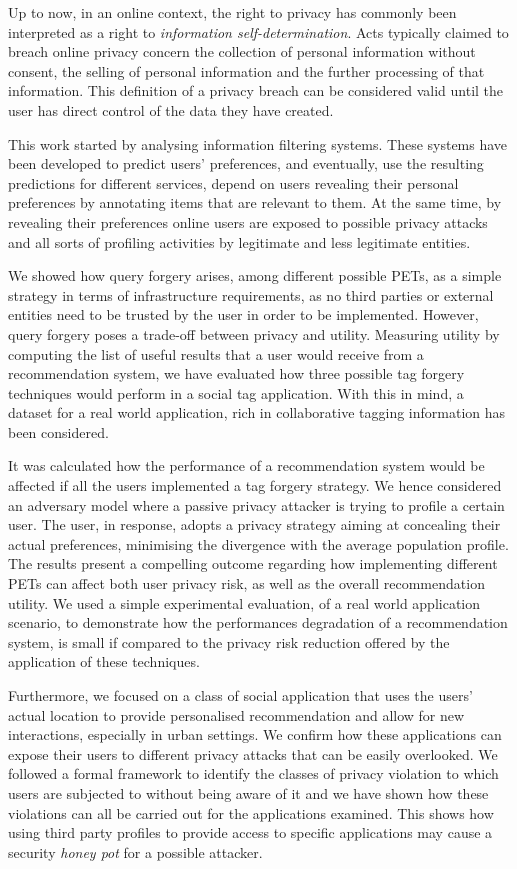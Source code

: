 Up to now, in an online context, the right to privacy has commonly been interpreted as a right to \emph{information self-determination}. Acts typically claimed to breach online privacy concern the collection of personal information without consent, the selling of personal information and the further processing of that information. This definition of a privacy breach can be considered valid until the user has direct control of the data they have created.

This work started by analysing information filtering systems. These systems have been developed to predict users' preferences, and eventually, use the resulting predictions for different services, depend on users revealing their personal preferences by annotating items that are relevant to them.  At the same time, by revealing their preferences online users are exposed to possible privacy attacks and all sorts of profiling activities by legitimate and less legitimate entities.

We showed how query forgery arises, among different possible PETs, as a simple strategy in terms of infrastructure requirements, as no third parties or external entities need to be trusted by the user in order to be implemented. However, query forgery poses a trade-off between privacy and utility. Measuring utility by computing the list of useful results that a user would receive from a recommendation system, we have evaluated how three possible tag forgery techniques would perform in a social tag application. With this in mind, a dataset for a real world application, rich in collaborative tagging information has been considered.

It was calculated how the performance of a recommendation system would be affected if all the users implemented a tag forgery strategy. We hence considered an adversary model where a passive privacy attacker is trying to profile a certain user. The user, in response, adopts a privacy strategy aiming at concealing their actual preferences, minimising the divergence with the average population profile. The results present a compelling outcome regarding how implementing different PETs can affect both user privacy risk, as well as the overall recommendation utility. We used a simple experimental evaluation, of a real world application scenario, to demonstrate how the performances degradation of a recommendation system, is small if compared to the privacy risk reduction offered by the application of these techniques.

Furthermore, we focused on a class of social application that uses the users' actual location to provide personalised recommendation and allow for new interactions, especially in urban settings. We confirm how these applications can expose their users to different privacy attacks that can be easily overlooked. We followed a formal framework to identify the classes of privacy violation to which users are subjected to without being aware of it and we have shown how these violations can all be carried out for the applications examined. This shows how using third party profiles to provide access to specific applications may cause a security \emph{honey pot} for a possible attacker.

